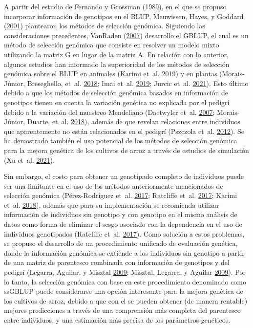 \documentclass[11pt,spanish,a4paper,oneside,]{book} %
\begin{document}
A partir del estudio de Fernando y Grossman (\protect\hyperlink{ref-cite:73}{1989}), en el que se propuso incorporar información de genotipos en el BLUP, Meuwissen, Hayes, y Goddard (\protect\hyperlink{ref-cite:8}{2001}) plantearon los métodos de selección genómica. Siguiendo las consideraciones precedentes, VanRaden (\protect\hyperlink{ref-cite:39}{2007}) desarrollo el GBLUP, el cual es un método de selección genómica que consiste en resolver un modelo mixto utilizando la matriz G en lugar de la matriz A. En relación con lo anterior, algunos estudios han informado la superioridad de los métodos de selección genómica sobre el BLUP en animales (Karimi et~al. \protect\hyperlink{ref-cite:75}{2019}) y en plantas (Morais-Júnior, Breseghello, et~al. \protect\hyperlink{ref-cite:68}{2018}; Imai et~al. \protect\hyperlink{ref-cite:20}{2019}; Jurcic et~al. \protect\hyperlink{ref-cite:11}{2021}). Esto último debido a que los métodos de selección genómica basados en información de genotipos tienen en cuenta la variación genética no explicada por el pedigrí debido a la variación del muestreo Mendeliano (Daetwyler et~al. \protect\hyperlink{ref-cite:40}{2007}; Morais-Júnior, Duarte, et~al. \protect\hyperlink{ref-cite:69}{2018}), además de que revelan relaciones entre individuos que aparentemente no están relacionados en el pedigrí (Pszczola et~al. \protect\hyperlink{ref-cite:74}{2012}). Se ha demostrado también el uso potencial de los métodos de selección genómica para la mejora genética de los cultivos de arroz a través de estudios de simulación (Xu et~al. \protect\hyperlink{ref-cite:60}{2021}).

Sin embargo, el costo para obtener un genotipado completo de individuos puede ser una limitante en el uso de los métodos anteriormente mencionados de selección genómica (Pérez-Rodríguez et~al. \protect\hyperlink{ref-cite:19}{2017}; Ratcliffe et~al. \protect\hyperlink{ref-cite:72}{2017}; Karimi et~al. \protect\hyperlink{ref-cite:76}{2018}), además que para su implementación se recomienda utilizar información de individuos sin genotipo y con genotipo en el mismo análisis de datos como forma de eliminar el sesgo asociado con la dependencia en el uso de individuos genotipados (Ratcliffe et~al. \protect\hyperlink{ref-cite:72}{2017}). Como solución a estos problemas, se propuso el desarrollo de un procedimiento unificado de evaluación genética, donde la información genómica se extiende a los individuos sin genotipo a partir de una matriz de parentesco combinada con información de genotipos y del pedigrí (Legarra, Aguilar, y Misztal \protect\hyperlink{ref-cite:17}{2009}; Misztal, Legarra, y Aguilar \protect\hyperlink{ref-cite:16}{2009}). Por lo tanto, la selección genómica con base en este procedimiento denominado como ssGBLUP puede considerarse una opción interesante para la mejora genética de los cultivos de arroz, debido a que con el se pueden obtener (de manera rentable) mejores predicciones a través de una comprensión más completa del parentesco entre individuos, y una estimación más precisa de los parámetros genéticos.
\end{document}
